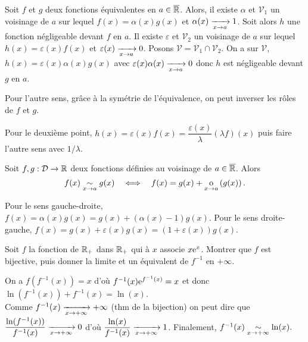 \documentclass{magnolia}
\begin{document}
\begin{preuve}
Soit $f$ et $g$ deux fonctions équivalentes en $a\in\overline{\mathbb{R}}$. Alors, il existe $\alpha$ et $\mathcal{V}_1$ un voisinage de $a$ sur lequel $f(x)=\alpha(x)g(x)$ et $\alpha(x)\xrightarrow[x\rightarrow a]{}1$. Soit alors $h$ une fonction négligeable devant $f$ en $a$. Il existe $\varepsilon$ et $\mathcal{V}_2$ un voisinage de $a$ sur lequel $h(x)=\varepsilon(x)f(x)$ et $\varepsilon(x)\xrightarrow[x\rightarrow a]{}0$. Posons $\mathcal{V}=\mathcal{V}_1\cap\mathcal{V}_2$. On a sur $\mathcal{V}$, $h(x)=\varepsilon(x)\alpha(x)g(x)$ avec $\varepsilon(x)\alpha(x)\xrightarrow[x\rightarrow a]{}0$ donc $h$ est négligeable devant $g$ en $a$.

Pour l'autre sens, grâce à la symétrie de l'équivalence, on peut inverser les rôles de $f$ et $g$.

\medskip

Pour le deuxième point, $h(x)=\varepsilon(x)f(x)=\dfrac{\varepsilon(x)}{\lambda}(\lambda f)(x)$ puis faire l'autre sens avec $1/\lambda$.
\end{preuve}


\begin{proposition}[utile=-3]
Soit $f,g:\mathcal{D}\to\mathbb{R}$ deux fonctions définies au voisinage de $a\in\overline{\mathbb{R}}$. Alors
\[f(x)\underset{x\rightarrow a}{\sim}g(x) \quad\Longleftrightarrow\quad f(x)=g(x)+\underset{x \rightarrow a}{\text{o}}\left(g(x)\right).\]  
\end{proposition}

\begin{preuve}
Pour le sens gauche-droite, $f(x)=\alpha(x)g(x)=g(x)+(\alpha(x)-1)g(x)$. Pour le sens droite-gauche, $f(x)=g(x)+\varepsilon(x)g(x)=(1+\varepsilon(x))g(x)$.
\end{preuve}

\begin{exoUnique}
\exo Soit $f$ la fonction de $\mathbb{R}_+$ dans $\mathbb{R}_+$ qui à $x$ associe $x{\rm e}^x$.
  Montrer que $f$ est bijective, puis donner la limite et un équivalent de
  $f^{-1}$ en $+\infty$.
  \begin{sol}
  On a $f(f^{-1}(x))=x$ d'où $f^{-1}(x){\rm e}^{f^{-1}(x)}=x$ et donc $\ln(f^{-1}(x))+f^{-1}(x)=\ln(x)$.\\
  
  Comme $f^{-1}(x)\xrightarrow[x\rightarrow +\infty]{}+\infty$ (thm de la bijection) on peut dire que $\dfrac{\ln(f^{-1}(x))}{f^{-1}(x)} \xrightarrow[x\rightarrow +\infty]{}0$ d'où $\dfrac{\ln(x)}{f^{-1}(x)} \xrightarrow[x\rightarrow +\infty]{}1$. Finalement, $f^{-1}(x)\underset{x\rightarrow +\infty}{\sim}\ln(x).$
  \end{sol}
\end{exoUnique}
\end{document}
